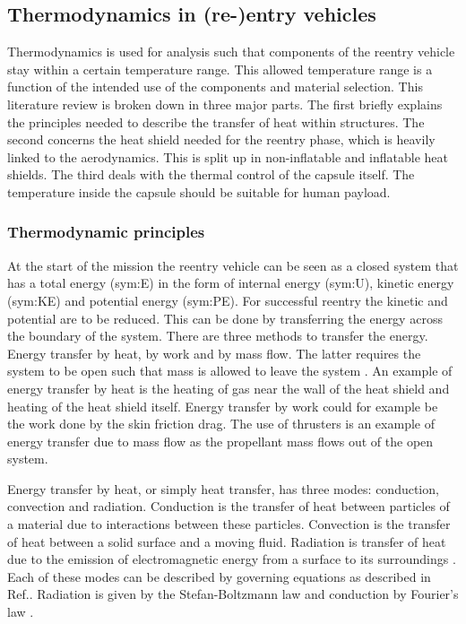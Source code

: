 \subsection{Thermodynamics in (re-)entry vehicles}\label{sec:thermo}
Thermodynamics is used for analysis such that components of the reentry vehicle stay within a certain temperature range. This allowed temperature range is a function of the intended use of the components and material selection. This literature review is broken down in three major parts. The first briefly explains the principles needed to describe the transfer of heat within structures. The second concerns the heat shield needed for the reentry phase, which is heavily linked to the aerodynamics. This is split up in non-inflatable and inflatable heat shields. The third deals with the thermal control of the capsule itself. The temperature inside the capsule should be suitable for human payload.

\subsubsection{Thermodynamic principles}
At the start of the mission the reentry vehicle can be seen as a closed system that has a total energy (\gls{sym:E}) in the form of internal energy (\gls{sym:U}), kinetic energy (\gls{sym:KE}) and potential energy (\gls{sym:PE}). For successful reentry the kinetic and potential are to be reduced. This can be done by transferring the energy across the boundary of the system. There are three methods to transfer the energy. Energy transfer by heat, by work and by mass flow. The latter requires the system to be open such that mass is allowed to leave the system \cite{Cengel2010}. An example of energy transfer by heat is the heating of gas near the wall of the heat shield and heating of the heat shield itself. Energy transfer by work could for example be the work done by the skin friction drag. The use of thrusters is an example of energy transfer due to mass flow as the propellant mass flows out of the open system. 

Energy transfer by heat, or simply heat transfer, has three modes: conduction, convection and radiation. Conduction is the transfer of heat between particles of a material due to interactions between these particles. Convection is the transfer of heat between a solid surface and a moving fluid. Radiation is transfer of heat due to the emission of electromagnetic energy from a surface to its surroundings \cite{Cengel2010, Karam1998}. Each of these modes can be described by governing equations as described in Ref.\cite{Holman2002}. Radiation is given by the Stefan-Boltzmann law and conduction by Fourier's law \cite{Cengel2010, Holman2002}.

